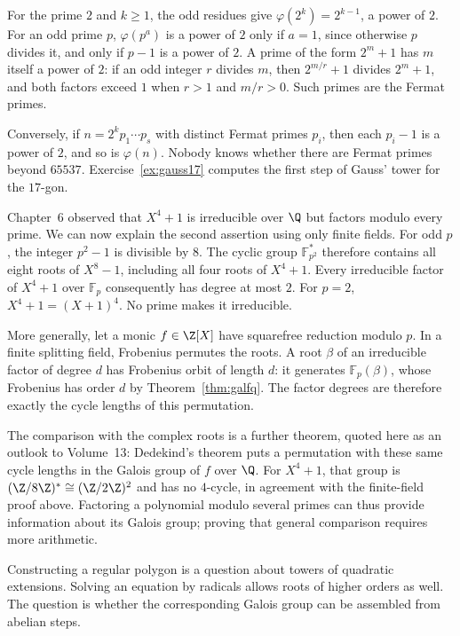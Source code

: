 For the prime $2$ and $k\ge1$, the odd residues give $\varphi(2^{k})=2^{k-1}$, a power of $2$. For an odd prime $p$, $\varphi(p^{a})$ is a power of $2$ only if $a=1$, since otherwise $p$ divides it, and only if $p-1$ is a power of $2$. A prime of the form $2^{m}+1$ has $m$ itself a power of $2$: if an odd integer $r$ divides $m$, then $2^{m/r}+1$ divides $2^{m}+1$, and both factors exceed $1$ when $r>1$ and $m/r>0$. Such primes are the Fermat primes.

Conversely, if $n=2^{k}p_1\cdots p_s$ with distinct Fermat primes $p_i$, then each $p_i-1$ is a power of $2$, and so is $\varphi(n)$. Nobody knows whether there are Fermat primes beyond $65537$. Exercise~\ref{ex:gauss17} computes the first step of Gauss' tower for the $17$-gon.

\begin{remark}
Chapter~6 observed that $X^4+1$ is irreducible over $\Q$ but factors modulo
every prime. We can now explain the second assertion using only finite fields.
For odd $p$, the integer $p^2-1$ is divisible by $8$. The cyclic group
$\mathbb F_{p^2}^*$ therefore contains all eight roots of $X^8-1$, including
all four roots of $X^4+1$. Every irreducible factor of $X^4+1$ over
$\mathbb F_p$ consequently has degree at most $2$. For $p=2$,
$X^4+1=(X+1)^4$. No prime makes it irreducible.

More generally, let a monic $f\in\Z[X]$ have squarefree reduction modulo
$p$. In a finite splitting field, Frobenius permutes the roots. A root
$\beta$ of an irreducible factor of degree $d$ has Frobenius orbit of
length $d$: it generates $\mathbb F_p(\beta)$, whose Frobenius has order
$d$ by Theorem~\ref{thm:galfq}. The factor degrees are therefore exactly
the cycle lengths of this permutation.

The comparison with the complex roots is a further theorem, quoted here
as an outlook to Volume~13: Dedekind's theorem puts a permutation with
these same cycle lengths in the Galois group of $f$ over $\Q$.
For $X^4+1$, that group is $(\Z/8\Z)^*\cong(\Z/2\Z)^2$ and has no
$4$-cycle, in agreement with the finite-field proof above. Factoring a
polynomial modulo several primes can thus provide information about its
Galois group; proving that general comparison requires more arithmetic.
\end{remark}

Constructing a regular polygon is a question about towers of quadratic extensions. Solving an equation by radicals allows roots of higher orders as well. The question is whether the corresponding Galois group can be assembled from abelian steps.

